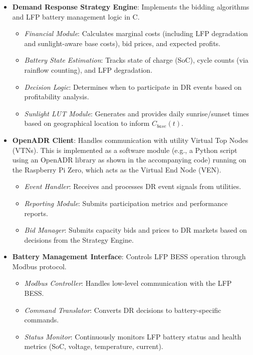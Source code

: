 \documentclass[11pt,a4paper]{article}
\begin{document}
\begin{itemize}
    \item \textbf{Demand Response Strategy Engine}: Implements the bidding algorithms and LFP battery management logic in C.
    \begin{itemize}
        \item \textit{Financial Module}: Calculates marginal costs (including LFP degradation and sunlight-aware base costs), bid prices, and expected profits.
        \item \textit{Battery State Estimation}: Tracks state of charge (SoC), cycle counts (via rainflow counting), and LFP degradation.
        \item \textit{Decision Logic}: Determines when to participate in DR events based on profitability analysis.
        \item \textit{Sunlight LUT Module}: Generates and provides daily sunrise/sunset times based on geographical location to inform $C_{base}(t)$.
    \end{itemize}
    
    \item \textbf{OpenADR Client}: Handles communication with utility Virtual Top Nodes (VTNs). This is implemented as a software module (e.g., a Python script using an OpenADR library as shown in the accompanying code) running on the Raspberry Pi Zero, which acts as the Virtual End Node (VEN).
    \begin{itemize}
        \item \textit{Event Handler}: Receives and processes DR event signals from utilities.
        \item \textit{Reporting Module}: Submits participation metrics and performance reports.
        \item \textit{Bid Manager}: Submits capacity bids and prices to DR markets based on decisions from the Strategy Engine.
    \end{itemize}
    
    \item \textbf{Battery Management Interface}: Controls LFP BESS operation through Modbus protocol.
    \begin{itemize}
        \item \textit{Modbus Controller}: Handles low-level communication with the LFP BESS.
        \item \textit{Command Translator}: Converts DR decisions to battery-specific commands.
        \item \textit{Status Monitor}: Continuously monitors LFP battery status and health metrics (SoC, voltage, temperature, current).
    \end{itemize}
\end{itemize}
\end{document}
